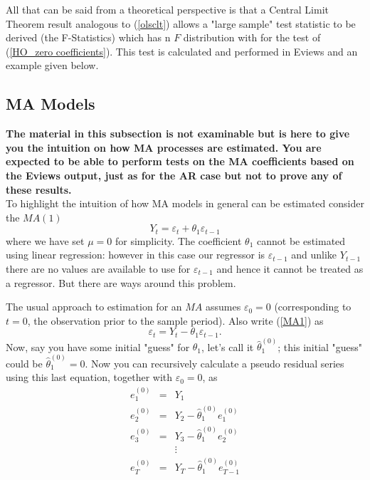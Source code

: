 \documentclass[openany]{tufte-book} %
\begin{document}
 All that can be said from a theoretical perspective is that a
Central Limit Theorem result analogous to (\ref{olsclt}) allows a "large
sample" test statistic to be derived (the F-Statistics) which has n  $F$ distribution
with for the test of (\ref{HO_zero coefficients}). This test is calculated and performed in Eviews and an example given below.




\subsection{MA Models}
\textbf{The material in this subsection is not examinable but is here to give you the intuition on how MA processes are estimated. You are expected to be able to perform tests on the MA coefficients based on the Eviews output, just as for the AR case but not to prove any of these results.}\\

To highlight the intuition of how MA models in general can be estimated consider the $MA(1)$%
\begin{equation}
Y_{t}=\varepsilon _{t}+\theta _{1}\varepsilon _{t-1}  \label{MA1}
\end{equation}%
where we have set $\mu =0$ for simplicity. The coefficient $\theta _{1}$
cannot be estimated using linear regression: however in this case our regressor is $\varepsilon_{t-1}$ and unlike $Y_{t-1}$ there are  no values are available to use
for $\varepsilon _{t-1}$ and hence it cannot be treated as a regressor. But
there are ways around this problem.

The usual approach to estimation for an $MA$ assumes $\varepsilon _{0}=0$
(corresponding to $t=0$, the observation prior to the sample period). Also
write (\ref{MA1}) as%
\begin{equation*}
\varepsilon _{t}=Y_{t}-\theta _{1}\varepsilon _{t-1}.
\end{equation*}%
Now, say you have some initial "guess" for $\theta _{1}$, let's call it $%
\widehat{\theta }_{1}^{(0)}$; this initial "guess" could be $\widehat{\theta
}_{1}^{(0)}=0$. Now you can recursively calculate a pseudo residual series
using this last equation, together with $\varepsilon _{0}=0$, as%
\begin{eqnarray*}
	e_{1}^{(0)} &=&Y_{1} \\
	e_{2}^{(0)} &=&Y_{2}-\widehat{\theta }_{1}^{(0)}e_{1}^{(0)} \\
	e_{3}^{(0)} &=&Y_{3}-\widehat{\theta }_{1}^{(0)}e_{2}^{(0)} \\
	&&\vdots \\
	e_{T}^{(0)} &=&Y_{T}-\widehat{\theta }_{1}^{(0)}e_{T-1}^{(0)}
\end{eqnarray*}
\end{document}

